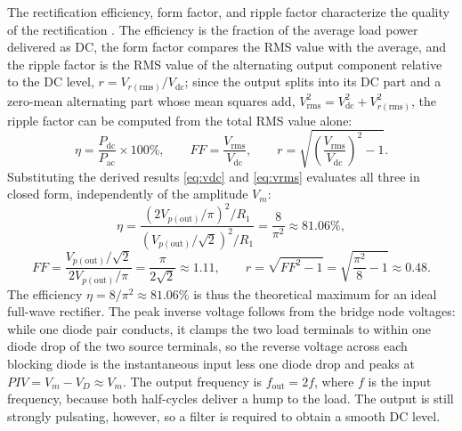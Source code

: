 \documentclass[12pt,a4paper]{article}
\begin{document}
	The rectification efficiency, form factor, and ripple factor characterize the quality of the rectification \cite{ref:theraja}. The efficiency is the fraction of the average load power delivered as DC, the form factor compares the RMS value with the average, and the ripple factor is the RMS value of the alternating output component relative to the DC level, $r = V_{r(\mathrm{rms})}/V_{\mathrm{dc}}$; since the output splits into its DC part and a zero-mean alternating part whose mean squares add, $V_{\mathrm{rms}}^{2} = V_{\mathrm{dc}}^{2} + V_{r(\mathrm{rms})}^{2}$, the ripple factor can be computed from the total RMS value alone:
	\begin{equation}
		\eta = \frac{P_{\mathrm{dc}}}{P_{\mathrm{ac}}}\times 100\%,
		\qquad
		FF = \frac{V_{\mathrm{rms}}}{V_{\mathrm{dc}}},
		\qquad
		r = \sqrt{\left(\frac{V_{\mathrm{rms}}}{V_{\mathrm{dc}}}\right)^{2}-1}.
		\label{eq:eta-ff-r}
	\end{equation}
	Substituting the derived results \eqref{eq:vdc} and \eqref{eq:vrms} evaluates all three in closed form, independently of the amplitude $V_m$:
	\begin{equation}
		\eta = \frac{\left(2V_{p(\mathrm{out})}/\pi\right)^{2}/R_1}{\left(V_{p(\mathrm{out})}/\sqrt{2}\right)^{2}/R_1}
		= \frac{8}{\pi^{2}} \approx 81.06\% ,
		\label{eq:eta-deriv}
	\end{equation}
	\begin{equation}
		FF = \frac{V_{p(\mathrm{out})}/\sqrt{2}}{2V_{p(\mathrm{out})}/\pi}
		= \frac{\pi}{2\sqrt{2}} \approx 1.11,
		\qquad
		r = \sqrt{FF^{2}-1} = \sqrt{\frac{\pi^{2}}{8}-1} \approx 0.48 .
		\label{eq:ff-deriv}
	\end{equation}
	The efficiency $\eta = 8/\pi^{2} \approx 81.06\%$ is thus the theoretical maximum for an ideal full-wave rectifier. The peak inverse voltage follows from the bridge node voltages: while one diode pair conducts, it clamps the two load terminals to within one diode drop of the two source terminals, so the reverse voltage across each blocking diode is the instantaneous input less one diode drop and peaks at $PIV = V_m - V_D \approx V_m$. The output frequency is $f_{\mathrm{out}} = 2f$, where $f$ is the input frequency, because both half-cycles deliver a hump to the load. The output is still strongly pulsating, however, so a filter is required to obtain a smooth DC level.
	
\end{document}
